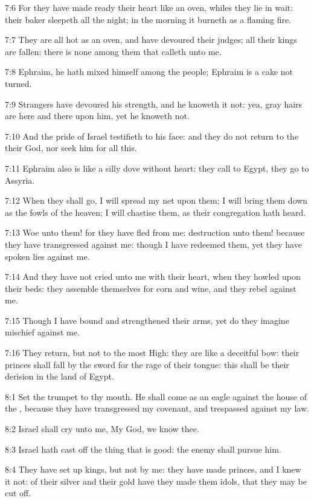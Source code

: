 7:6 For they have made ready their heart like an oven, whiles they lie in wait: their baker sleepeth all the night; in the morning it burneth as a flaming fire.

7:7 They are all hot as an oven, and have devoured their judges; all their kings are fallen: there is none among them that calleth unto me.

7:8 Ephraim, he hath mixed himself among the people; Ephraim is a cake not turned.

7:9 Strangers have devoured his strength, and he knoweth it not: yea, gray hairs are here and there upon him, yet he knoweth not.

7:10 And the pride of Israel testifieth to his face: and they do not return to the \LORD their God, nor seek him for all this.

7:11 Ephraim also is like a silly dove without heart: they call to Egypt, they go to Assyria.

7:12 When they shall go, I will spread my net upon them; I will bring them down as the fowls of the heaven; I will chastise them, as their congregation hath heard.

7:13 Woe unto them! for they have fled from me: destruction unto them!  because they have transgressed against me: though I have redeemed them, yet they have spoken lies against me.

7:14 And they have not cried unto me with their heart, when they howled upon their beds: they assemble themselves for corn and wine, and they rebel against me.

7:15 Though I have bound and strengthened their arms, yet do they imagine mischief against me.

7:16 They return, but not to the most High: they are like a deceitful bow: their princes shall fall by the sword for the rage of their tongue: this shall be their derision in the land of Egypt.

8:1 Set the trumpet to thy mouth. He shall come as an eagle against the house of the \LORD, because they have transgressed my covenant, and trespassed against my law.

8:2 Israel shall cry unto me, My God, we know thee.

8:3 Israel hath cast off the thing that is good: the enemy shall pursue him.

8:4 They have set up kings, but not by me: they have made princes, and I knew it not: of their silver and their gold have they made them idols, that they may be cut off.

